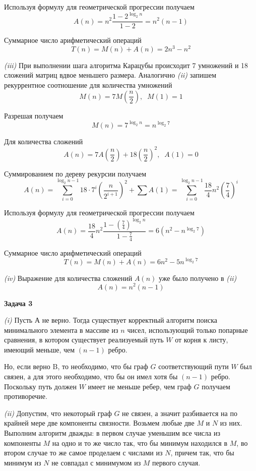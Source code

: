\documentclass[10pt]{article}
\begin{document}
Используя формулу для геометрической прогрессии получаем
$$
  A(n) = n^2 \frac{1 - 2^{\log_2{n}}}{1 - 2} = n^2 (n - 1)
$$

Суммарное число арифметический операций
$$
  T(n) = M(n) + A(n) = 2 n^3 - n^2
$$

\smallskip

{\it (iii)}
При выполнении шага алгоритма Карацубы происходит 7 умножений и 18 сложений матриц вдвое меньшего размера. Аналогично {\it (ii)} запишем рекуррентное соотношение для количества умножений
$$
  M(n) = 7 M \left( \frac{n}{2} \right), \;\; M(1) = 1
$$

Разрешая получаем
$$
  M(n) = 7^{\log_2{n}} = n^{\log_2 7}
$$

Для количества сложений
$$
  A(n) = 7 A \left( \frac{n}{2} \right) + 18 \left( \frac{n}{2} \right)^2, \;\; A(1) = 0
$$

Суммированием по дереву рекурсии получаем
$$
  A(n) = \sum \limits_{i = 0}^{\log_2{n} - 1} 18 \cdot 7^i \left( \frac{n}{2^{i + 1}} \right)^2  + \sum A(1) = \sum \limits_{i = 0}^{\log_2{n} - 1} \frac{18}{4} n^2 \left( \frac{7}{4} \right)^i
$$

Используя формулу для геометрической прогрессии получаем
$$
  A(n) = \frac{18}{4} n^2 \frac{1 - \left( \frac{7}{4} \right)^{\log_2{n}}}{1 - \frac{7}{4}} = 6 (n^2 - n^{\log_2{7}})
$$

Суммарное число арифметический операций
$$
  T(n) = M(n) + A(n) = 6 n^2 - 5 n^{\log_2{7}}
$$

\smallskip

{\it (iv)}
Выражение для количества сложений $A(n)$ уже было получено в {\it (ii)}
$$
  A(n) = n^2 (n - 1)
$$

\medskip

{\bf Задача 3}

{\it (i)}
Пусть А не верно. Тогда существует корректный алгоритм поиска минимального элемента в массиве из $n$ чисел, использующий только попарные сравнения, в котором существует реализуемый путь $W$ от корня к листу, имеющий меньше, чем $(n - 1)$ ребро.

Но, если верно B, то необходимо, что бы граф $G$ соответствующий пути $W$ был связен, а для этого необходимо, что бы он имел хотя бы $(n - 1)$ ребро. Поскольку путь должен $W$ имеет не меньше ребер, чем граф $G$ получаем противоречие.

\smallskip

{\it (ii)}
Допустим, что некоторый граф $G$ не связен, а значит разбивается на по крайней мере две компоненты связности. Возьмем любые две $M$ и $N$ из них. Выполним алгоритм дважды: в первом случае уменьшим все числа из компоненты $M$ на одно и то же число так, что бы минимум находился в $M$, во втором случае то же самое проделаем с числами из $N$, причем так, что бы минимум из $N$ не совпадал с минимумом из $M$ первого случая.
\end{document}
